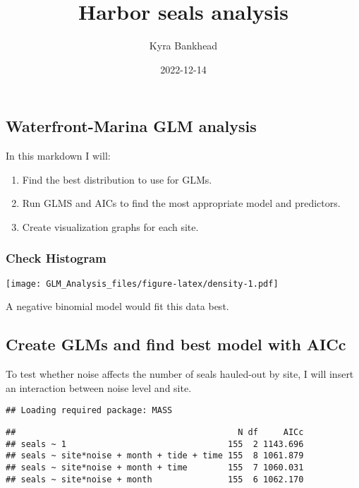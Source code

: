 \documentclass[
]{article}
\title{Harbor seals analysis}
\author{Kyra Bankhead}
\date{2022-12-14}
\begin{document}
\maketitle

\hypertarget{waterfront-marina-glm-analysis}{%
\subsection{Waterfront-Marina GLM
analysis}\label{waterfront-marina-glm-analysis}}

In this markdown I will:

\begin{enumerate}
\def\labelenumi{\arabic{enumi}.}
\item
  Find the best distribution to use for GLMs.
\item
  Run GLMS and AICs to find the most appropriate model and predictors.
\item
  Create visualization graphs for each site.
\end{enumerate}

\hypertarget{check-histogram}{%
\subsubsection{Check Histogram}\label{check-histogram}}

\texttt{[image: GLM\_Analysis\_files/figure-latex/density-1.pdf]}

A negative binomial model would fit this data best.

\hypertarget{create-glms-and-find-best-model-with-aicc}{%
\subsection{Create GLMs and find best model with
AICc}\label{create-glms-and-find-best-model-with-aicc}}

To test whether noise affects the number of seals hauled-out by site, I
will insert an interaction between noise level and site.

\begin{verbatim}
## Loading required package: MASS
\end{verbatim}

\begin{verbatim}
##                                            N df     AICc
## seals ~ 1                                155  2 1143.696
## seals ~ site*noise + month + tide + time 155  8 1061.879
## seals ~ site*noise + month + time        155  7 1060.031
## seals ~ site*noise + month               155  6 1062.170
\end{verbatim}
\end{document}
